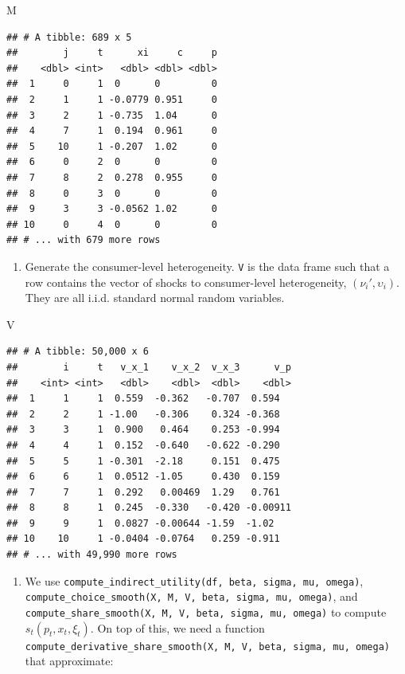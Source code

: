 \documentclass[]{book}
\newenvironment{Shaded}{\begin{snugshade}}{\end{snugshade}}
\newcommand{\NormalTok}[1]{#1}
\providecommand{\tightlist}{%
  \setlength{\itemsep}{0pt}\setlength{\parskip}{0pt}}
\begin{document}
\begin{Shaded}
\begin{Highlighting}[]
\NormalTok{M}
\end{Highlighting}
\end{Shaded}

\begin{verbatim}
## # A tibble: 689 x 5
##        j     t      xi     c     p
##    <dbl> <int>   <dbl> <dbl> <dbl>
##  1     0     1  0      0         0
##  2     1     1 -0.0779 0.951     0
##  3     2     1 -0.735  1.04      0
##  4     7     1  0.194  0.961     0
##  5    10     1 -0.207  1.02      0
##  6     0     2  0      0         0
##  7     8     2  0.278  0.955     0
##  8     0     3  0      0         0
##  9     3     3 -0.0562 1.02      0
## 10     0     4  0      0         0
## # ... with 679 more rows
\end{verbatim}

\begin{enumerate}
\def\labelenumi{\arabic{enumi}.}
\setcounter{enumi}{3}
\tightlist
\item
  Generate the consumer-level heterogeneity. \texttt{V} is the data
  frame such that a row contains the vector of shocks to consumer-level
  heterogeneity, \((\nu_{i}', \upsilon_i)\). They are all i.i.d.
  standard normal random variables.
\end{enumerate}

\begin{Shaded}
\begin{Highlighting}[]
\NormalTok{V}
\end{Highlighting}
\end{Shaded}

\begin{verbatim}
## # A tibble: 50,000 x 6
##        i     t   v_x_1    v_x_2  v_x_3      v_p
##    <int> <int>   <dbl>    <dbl>  <dbl>    <dbl>
##  1     1     1  0.559  -0.362   -0.707  0.594  
##  2     2     1 -1.00   -0.306    0.324 -0.368  
##  3     3     1  0.900   0.464    0.253 -0.994  
##  4     4     1  0.152  -0.640   -0.622 -0.290  
##  5     5     1 -0.301  -2.18     0.151  0.475  
##  6     6     1  0.0512 -1.05     0.430  0.159  
##  7     7     1  0.292   0.00469  1.29   0.761  
##  8     8     1  0.245  -0.330   -0.420 -0.00911
##  9     9     1  0.0827 -0.00644 -1.59  -1.02   
## 10    10     1 -0.0404 -0.0764   0.259 -0.911  
## # ... with 49,990 more rows
\end{verbatim}

\begin{enumerate}
\def\labelenumi{\arabic{enumi}.}
\setcounter{enumi}{4}
\tightlist
\item
  We use
  \texttt{compute\_indirect\_utility(df,\ beta,\ sigma,\ mu,\ omega)},
  \texttt{compute\_choice\_smooth(X,\ M,\ V,\ beta,\ sigma,\ mu,\ omega)},
  and
  \texttt{compute\_share\_smooth(X,\ M,\ V,\ beta,\ sigma,\ mu,\ omega)}
  to compute \(s_t(p_t, x_t, \xi_t)\). On top of this, we need a
  function
  \texttt{compute\_derivative\_share\_smooth(X,\ M,\ V,\ beta,\ sigma,\ mu,\ omega)}
  that approximate:
\end{enumerate}
\end{document}
